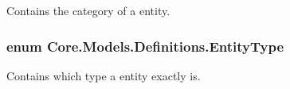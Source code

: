 Contains the category of a entity. 

\hypertarget{namespaceCore_1_1Models_1_1Definitions_a609ed13db028308ebc6c5fbd98615fdc}{
\subsubsection[{Entity\-Type}]{\setlength{\rightskip}{0pt plus 5cm}enum {\bf Core.\-Models.\-Definitions.\-Entity\-Type}}}\label{namespaceCore_1_1Models_1_1Definitions_a609ed13db028308ebc6c5fbd98615fdc}


Contains which type a entity exactly is. 

